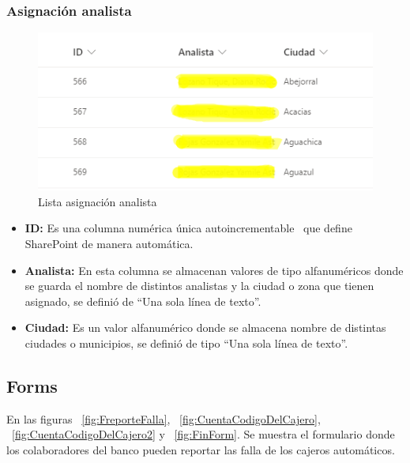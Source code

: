 \subsubsection{Asignación analista}
\begin{figure}[H]
	\centering
	\includegraphics[scale=0.5]{Capitulo3/imagenes/8.png}
	\caption{Lista asignación analista}
	\label{Aanalista}
\end{figure}

\begin{itemize}
	\item \textbf{ID: }Es una columna numérica única autoincrementable  que define SharePoint de manera automática.
	\item \textbf{Analista: } En esta columna se almacenan valores de tipo alfanuméricos donde se guarda el nombre de distintos analistas y la ciudad o zona que tienen asignado, se definió de ``Una sola línea de texto''.
	\item \textbf{Ciudad: }Es un valor alfanumérico donde se almacena nombre de distintas ciudades o municipios, se definió de tipo ``Una sola línea de texto''.
\end{itemize}

\subsection{Forms}
En las figuras ~\ref{fig:FreporteFalla}, ~\ref{fig:CuentaCodigoDelCajero}, ~\ref{fig:CuentaCodigoDelCajero2} y ~\ref{fig:FinForm}. Se muestra el formulario donde los colaboradores del banco pueden reportar las falla de los cajeros automáticos.

